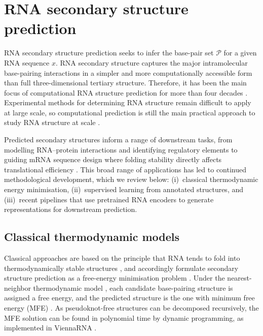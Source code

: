 \documentclass[logo,bsc,singlespacing,parskip]{infthesis}
\begin{document}
\section{RNA secondary structure prediction}
\label{sec:bg_prediction_paradigms}
RNA secondary structure prediction seeks to infer the base-pair set
$\mathcal{P}$ for a given RNA sequence $x$. 
RNA secondary structure captures the major intramolecular base-pairing interactions in a simpler and more computationally accessible form than full three-dimensional tertiary structure. Therefore, it has been the main focus of computational RNA structure prediction for more than four decades \citep{zuker1981optimal,tinoco1999how}.
Experimental methods for determining RNA structure remain difficult to apply at large scale, so computational prediction is still the main practical approach to study RNA structure at scale \citep{mathews2019benchmark}.

Predicted secondary structures inform a range of downstream tasks, from
modelling RNA--protein interactions and identifying regulatory elements
to guiding mRNA sequence design where folding stability directly affects translational efficiency
\citep{chaudhary2021mrna,jin2025mrna}. This broad range of applications has led to continued methodological development, which we review below: (i)~classical thermodynamic energy minimisation,
(ii)~supervised learning from annotated structures, and (iii)~recent
pipelines that use pretrained RNA encoders to generate representations for downstream prediction.

\subsection{Classical thermodynamic models}
\label{sec:bg_thermo}
Classical approaches are based on the principle that RNA tends to fold into thermodynamically stable structures \citep{tinoco1999how}, and accordingly formulate secondary structure prediction as a free-energy minimisation problem \citep{zuker1981optimal}. Under the nearest-neighbor thermodynamic model \cite{turner2009nndb}, each candidate base-pairing structure is assigned a free energy, and the predicted structure is the one with minimum free energy (MFE) \cite{zuker1981optimal}. 
As pseudoknot-free structures can be decomposed recursively, the MFE solution can be found in  polynomial time by dynamic programming, as implemented in ViennaRNA \citep{lorenz2011viennarna}.
\end{document}

